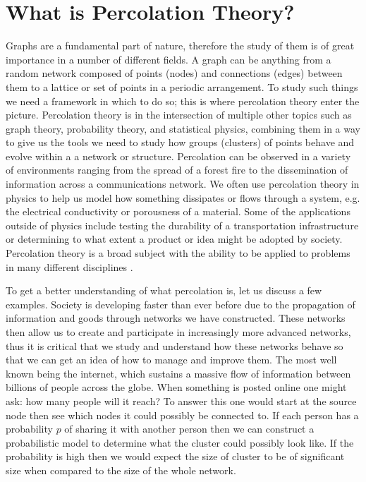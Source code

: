 \section{What is Percolation Theory?}
Graphs are a fundamental part of nature, therefore the study of them is of great importance in a number of different fields.
A graph can be anything from a random network composed of points (nodes) and connections (edges) between them to a lattice or set of points in a periodic arrangement.
To study such things we need a framework in which to do so; this is where percolation theory enter the picture.
Percolation theory is in the intersection of multiple other topics such as graph theory, probability theory, and statistical physics, combining them in a way to give us the tools we need to study how groups (clusters) of points behave and evolve within a a network or structure.
Percolation can be observed in a variety of environments ranging from the spread of a forest fire to the dissemination of information across a communications network.
We often use percolation theory in physics to help us model how something dissipates or flows through a system, e.g. the electrical conductivity or porousness of a material.
Some of the applications outside of physics include testing the durability of a transportation infrastructure or determining to what extent a product or idea might be adopted by society.
Percolation theory is a broad subject with the ability to be applied to problems in many different disciplines \cite{intro_to_percolation_theory} \cite{applications_of_percolation_theory}.

To get a better understanding of what percolation is, let us discuss a few examples.
Society is developing faster than ever before due to the propagation of information and goods through networks we have constructed.
These networks then allow us to create and participate in increasingly more advanced networks, thus it is critical that we study and understand how these networks behave so that we can get an idea of how to manage and improve them.
The most well known being the internet, which sustains a massive flow of information between billions of people across the globe.
When something is posted online one might ask: how many people will it reach?
To answer this one would start at the source node then see which nodes it could possibly be connected to.
If each person has a probability $p$ of sharing it with another person then we can construct a probabilistic model to determine what the cluster could possibly look like.
If the probability is high then we would expect the size of cluster to be of significant size when compared to the size of the whole network.

